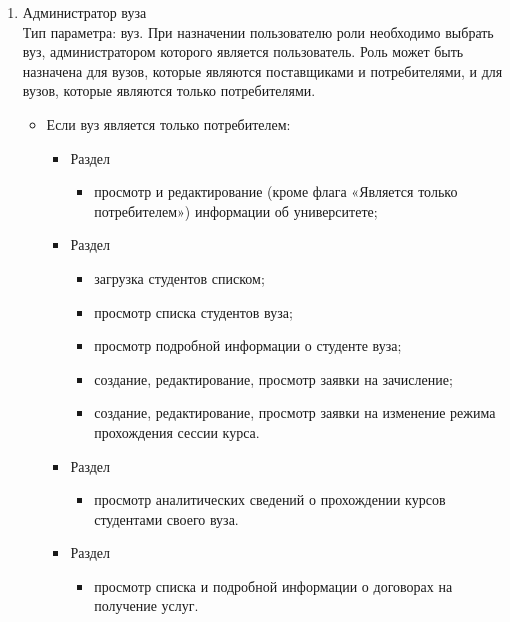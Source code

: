 \begin{enumerate}
	\item Администратор вуза\\
	Тип параметра: вуз. При назначении пользователю роли необходимо выбрать вуз, администратором которого является пользователь. Роль может быть назначена для вузов, которые являются поставщиками и потребителями, и для вузов, которые являются только потребителями.
	\begin{itemize}

		\item Если вуз является только потребителем:
		\begin{itemize}
			\item Раздел 
			\begin{itemize}
				\item просмотр и редактирование (кроме флага «Является только потребителем») информации об университете;
			\end{itemize}			
			\item Раздел 
			\begin{itemize}
				\item загрузка студентов списком;
				\item просмотр списка студентов вуза;
				\item просмотр подробной информации о студенте вуза;
				\item создание, редактирование, просмотр заявки на зачисление;
				\item создание, редактирование, просмотр заявки на изменение режима прохождения сессии курса.
			\end{itemize}
			\item Раздел 
			\begin{itemize}
				\item просмотр аналитических сведений о прохождении курсов студентами своего вуза.
			\end{itemize}
			\item Раздел 
			\begin{itemize}
				\item просмотр списка и подробной информации о договорах на получение услуг.
			\end{itemize}			
		\end{itemize}


\end{itemize}
\end{enumerate}
